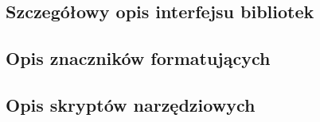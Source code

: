 




\subsection{Szczegółowy opis interfejsu bibliotek}
\label{dod_lib_api}




\subsection{Opis znaczników formatujących}
\label{dod_opis_znacznikow}

\clearpage


\subsection{Opis skryptów narzędziowych}

